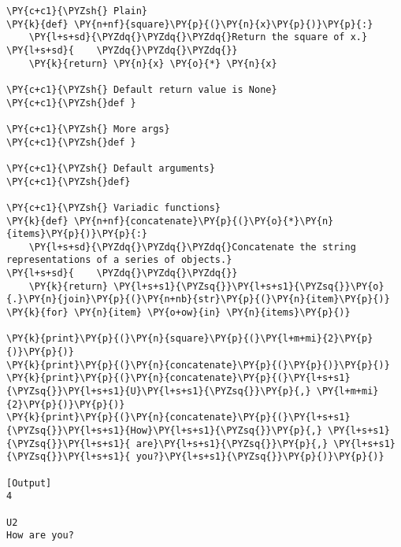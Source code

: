 \begin{Verbatim}[label=\makebox{\url{https://bitbucket.org/lbaldini/programming/src/tip/snippets/functions.py}},commandchars=\\\{\}]
\PY{c+c1}{\PYZsh{} Plain}
\PY{k}{def} \PY{n+nf}{square}\PY{p}{(}\PY{n}{x}\PY{p}{)}\PY{p}{:}
    \PY{l+s+sd}{\PYZdq{}\PYZdq{}\PYZdq{}Return the square of x.}
\PY{l+s+sd}{    \PYZdq{}\PYZdq{}\PYZdq{}}
    \PY{k}{return} \PY{n}{x} \PY{o}{*} \PY{n}{x}

\PY{c+c1}{\PYZsh{} Default return value is None}
\PY{c+c1}{\PYZsh{}def }

\PY{c+c1}{\PYZsh{} More args}
\PY{c+c1}{\PYZsh{}def }

\PY{c+c1}{\PYZsh{} Default arguments}
\PY{c+c1}{\PYZsh{}def}

\PY{c+c1}{\PYZsh{} Variadic functions}
\PY{k}{def} \PY{n+nf}{concatenate}\PY{p}{(}\PY{o}{*}\PY{n}{items}\PY{p}{)}\PY{p}{:}
    \PY{l+s+sd}{\PYZdq{}\PYZdq{}\PYZdq{}Concatenate the string representations of a series of objects.}
\PY{l+s+sd}{    \PYZdq{}\PYZdq{}\PYZdq{}}
    \PY{k}{return} \PY{l+s+s1}{\PYZsq{}}\PY{l+s+s1}{\PYZsq{}}\PY{o}{.}\PY{n}{join}\PY{p}{(}\PY{n+nb}{str}\PY{p}{(}\PY{n}{item}\PY{p}{)} \PY{k}{for} \PY{n}{item} \PY{o+ow}{in} \PY{n}{items}\PY{p}{)}

\PY{k}{print}\PY{p}{(}\PY{n}{square}\PY{p}{(}\PY{l+m+mi}{2}\PY{p}{)}\PY{p}{)}
\PY{k}{print}\PY{p}{(}\PY{n}{concatenate}\PY{p}{(}\PY{p}{)}\PY{p}{)}
\PY{k}{print}\PY{p}{(}\PY{n}{concatenate}\PY{p}{(}\PY{l+s+s1}{\PYZsq{}}\PY{l+s+s1}{U}\PY{l+s+s1}{\PYZsq{}}\PY{p}{,} \PY{l+m+mi}{2}\PY{p}{)}\PY{p}{)}
\PY{k}{print}\PY{p}{(}\PY{n}{concatenate}\PY{p}{(}\PY{l+s+s1}{\PYZsq{}}\PY{l+s+s1}{How}\PY{l+s+s1}{\PYZsq{}}\PY{p}{,} \PY{l+s+s1}{\PYZsq{}}\PY{l+s+s1}{ are}\PY{l+s+s1}{\PYZsq{}}\PY{p}{,} \PY{l+s+s1}{\PYZsq{}}\PY{l+s+s1}{ you?}\PY{l+s+s1}{\PYZsq{}}\PY{p}{)}\PY{p}{)}

[Output]
4

U2
How are you?
\end{Verbatim}